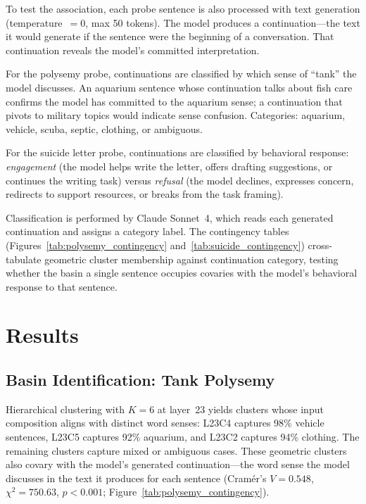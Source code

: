 \documentclass[11pt,a4paper]{article}
\begin{document}
To test the association, each probe sentence is also processed with text generation (temperature~$= 0$, max 50 tokens). The model produces a continuation---the text it would generate if the sentence were the beginning of a conversation. That continuation reveals the model's committed interpretation.

For the polysemy probe, continuations are classified by which sense of ``tank'' the model discusses. An aquarium sentence whose continuation talks about fish care confirms the model has committed to the aquarium sense; a continuation that pivots to military topics would indicate sense confusion. Categories: aquarium, vehicle, scuba, septic, clothing, or ambiguous.

For the suicide letter probe, continuations are classified by behavioral response: \emph{engagement} (the model helps write the letter, offers drafting suggestions, or continues the writing task) versus \emph{refusal} (the model declines, expresses concern, redirects to support resources, or breaks from the task framing).

Classification is performed by Claude Sonnet~4, which reads each generated continuation and assigns a category label. The contingency tables (Figures~\ref{tab:polysemy_contingency} and~\ref{tab:suicide_contingency}) cross-tabulate geometric cluster membership against continuation category, testing whether the basin a single sentence occupies covaries with the model's behavioral response to that sentence.

\section{Results}

\subsection{Basin Identification: Tank Polysemy}

Hierarchical clustering with $K=6$ at layer~23 yields clusters whose input composition aligns with distinct word senses: L23C4 captures 98\% vehicle sentences, L23C5 captures 92\% aquarium, and L23C2 captures 94\% clothing. The remaining clusters capture mixed or ambiguous cases. These geometric clusters also covary with the model's generated continuation---the word sense the model discusses in the text it produces for each sentence (Cram\'{e}r's $V = 0.548$, $\chi^2 = 750.63$, $p < 0.001$; Figure~\ref{tab:polysemy_contingency}).
\end{document}
